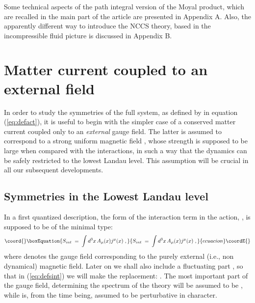 \documentclass[a4paper,12pt]{article}
\begin{document}
Some technical aspects of the path integral version of the Moyal
product, which are recalled in the main part of the article are
presented in Appendix A. Also, the apparently different way to
introduce the NCCS theory, based in the incompressible fluid
picture
is discussed in Appendix B.
 
\section{Matter current coupled to an external
field}\label{sec:ext}

In order to study the symmetries of the full system, as defined by
\coordHE{}
in equation (\ref{eq:defact}), it is useful to begin with the
simpler
case of a conserved matter current coupled only to an {\em
external\/}
gauge field.  The latter is assumed to correspond to a strong
uniform
magnetic field \coordHE{}, whose strength is supposed to be large when
compared with the interactions, in such a way that the dynamics can
be
safely restricted to the lowest Landau level. This assumption will
be
crucial in all our subsequent developments.

\subsection{Symmetries in the Lowest Landau level}

In a first quantized description, the form of the interaction term
in
the action, \coordHE{}, is supposed to be of the minimal type:
\begin{equation}\coord{}\boxEquation{
  \label{eq:defsint}
  S_{int}\;=\; \int d^3x \, A_{\mu}(x) j^\mu (x) \;,
}{
  S_{int}\;=\; \int d^3x \, A_{\mu}(x) j^\mu (x) \;,
}{ecuacion}\coordE{}\end{equation}
where \coordHE{} denotes the gauge field corresponding to the purely
external (i.e., non dynamical) magnetic field. Later on we shall
also
include a fluctuating part \coordHE{}, so that in (\ref{eq:defsint})
we
will make the replacement: \coordHE{}.  The most
important part
of the gauge field, determining the spectrum of the theory will be
assumed to be \coordHE{}, while \coordHE{} is, from the time being,
assumed to
be perturbative in character.
\end{document}
